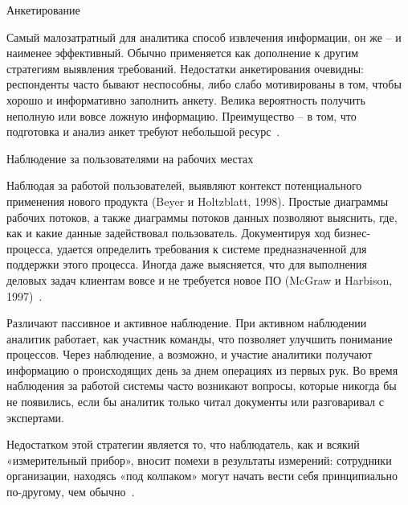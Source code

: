\documentclass{../industrial-development}
\begin{document}
\alert{Анкетирование}

Самый малозатратный для аналитика способ извлечения информации, он же – и наименее эффективный. Обычно применяется как дополнение к другим стратегиям выявления требований.
Недостатки анкетирования очевидны: респонденты часто бывают неспособны, либо слабо мотивированы в том, чтобы хорошо и информативно заполнить анкету. Велика вероятность получить неполную или вовсе ложную информацию. Преимущество – в том,
что подготовка и анализ анкет требуют небольшой ресурс~\cite[с.~32]{Maglinec}.

\alert{Наблюдение за пользователями на рабочих местах}

Наблюдая за работой пользователей, выявляют контекст потенциального применения нового продукта (Beyer и Holtzblatt, 1998). Простые диаграммы рабочих потоков, а также диаграммы потоков данных позволяют выяснить, где, как и какие данные задействовал пользователь. Документируя ход бизнес-процесса, удается определить требования к системе
предназначенной для поддержки этого процесса. Иногда даже выясняется, что для выполнения деловых задач клиентам вовсе и не требуется новое ПО (McGraw и Harbison, 1997)~\cite[с.~47]{Wiegers}.

Различают пассивное и активное наблюдение. При активном наблюдении аналитик работает, как участник команды, что позволяет улучшить понимание процессов. Через наблюдение, а возможно, и участие аналитики получают информацию о происходящих день за днем операциях из первых рук. Во время наблюдения за работой системы часто возникают вопросы, которые никогда бы не появились, если бы аналитик только читал документы или разговаривал с экспертами.

Недостатком этой стратегии является то, что наблюдатель, как и всякий «измерительный прибор», вносит помехи в результаты измерений: сотрудники
организации, находясь «под колпаком» могут начать вести себя принципиально по-другому, чем обычно~\cite[с.~32]{Maglinec}.
\end{document}
